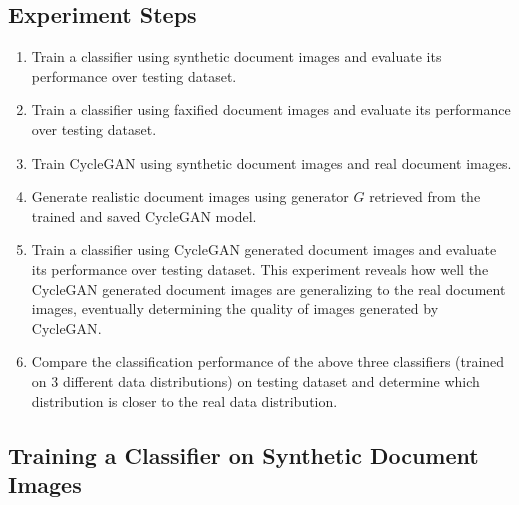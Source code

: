 \subsection{Experiment Steps}
\begin{enumerate}
    \itemsep0em 
    \item Train a classifier using synthetic document images and evaluate its performance over testing dataset.
    \item Train a classifier using faxified document images and evaluate its performance over testing dataset.
    \item Train \ac{CycleGAN} using synthetic document images and real document images.
    \item Generate realistic document images using generator $G$ retrieved from the trained and saved \ac{CycleGAN} model.
    \item Train a classifier using \ac{CycleGAN} generated document images and evaluate its performance over testing dataset. This experiment reveals how well the \ac{CycleGAN} generated document images are generalizing to the real document images, eventually determining the quality of images generated by \ac{CycleGAN}.
    \item Compare the classification performance of the above three classifiers (trained on 3 different data distributions) on testing dataset and determine which distribution is closer to the real data distribution.
\end{enumerate}



\subsection{Training a Classifier on Synthetic Document Images}\label{trainingsyntheticclassifier}

